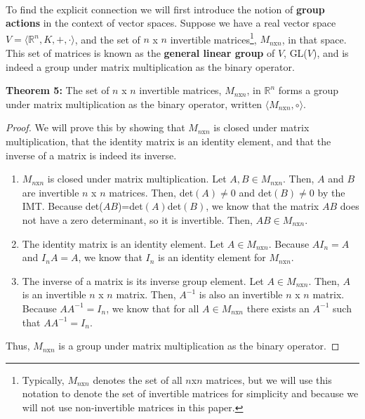 \documentclass[twoside]{article}
\newcommand{\R}{\mathbb{R}}
\newcommand{\done}{\renewcommand\qedsymbol{$\blacksquare$}}
\begin{document}
\paragraph*{} To find the explicit connection we will first introduce the notion of 
\textbf{group actions} in the context of vector spaces. Suppose we have a real vector space 
$V=\langle \R^n,K,+,\cdot\rangle$, and the 
set of $n$ x $n$ invertible matrices\footnote[5]{Typically, $M_{n\text{x}n}$ denotes the set of all $n$x$n$ matrices, but we will
use this notation to denote the set of invertible matrices for simplicity 
and because we will not use non-invertible matrices in this paper.
}, $M_{n\text{x}n}$, in that space.
This set of matrices is known as the \textbf{general linear group} of $V$, GL($V$),
and is indeed a group under matrix multiplication as the binary operator.
\begin{mdframed}[roundcorner=10pt, backgroundcolor=gray!10]
  \textbf{Theorem 5:} The set of $n$ x $n$ invertible matrices, $M_{n\text{x}n}$, in
  $\R^n$ forms a group under matrix multiplication as the binary operator, written 
  $\langle M_{n\text{x}n}, \circ\rangle$.
\end{mdframed}
\begin{proof}
  We will prove this by showing that $M_{n\text{x}n}$ is closed under matrix multiplication, 
  that the identity matrix is an identity element, and that the inverse of a matrix is 
  indeed its inverse. 
  \begin{enumerate}
    \item $M_{n\text{x}n}$ is closed under matrix multiplication. 
    Let $A,B\in M_{n\text{x}n}$. Then, $A$ and $B$ are invertible $n$ x $n$ matrices. 
    Then, det$(A) \neq 0$ and det$(B) \neq 0$ by the IMT. Because det($AB$)=det$(A)$det$(B)$,
    we know that the matrix $AB$ does not have a zero determinant, so it is invertible.
    Then, $AB\in M_{n\text{x}n}$.

    \item The identity matrix is an identity element. 
    Let $A\in M_{n\text{x}n}$. Because $AI_n=A$ and $I_nA=A$, we know that $I_n$
    is an identity element for $M_{n\text{x}n}$. 

    \item The inverse of a matrix is its inverse group element.  
    Let $A\in M_{n\text{x}n}$. Then, $A$ is an invertible $n$ x $n$ matrix. 
    Then, $A^{-1}$ is also an invertible $n$ x $n$ matrix. Because $AA^{-1}=I_n$,
    we know that for all $A\in M_{n\text{x}n}$ there exists an $A^{-1}$ such that $AA^{-1}=I_n$.
  \end{enumerate}
  Thus, $M_{n\text{x}n}$ is a group under matrix multiplication as the binary operator.
\done 
\end{proof}
\end{document}
